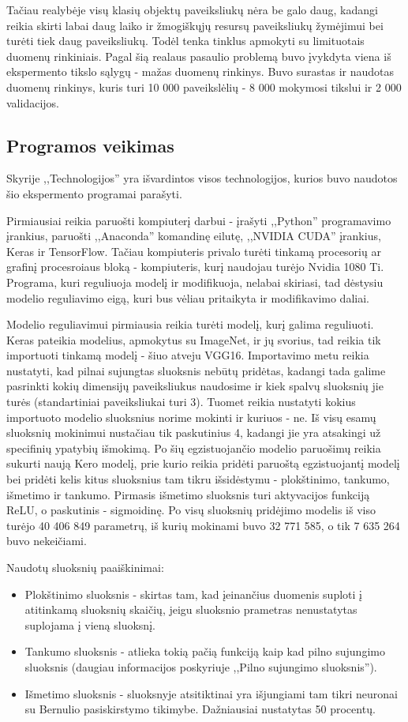 \documentclass{VUMIFPSkursinis}
\begin{document}
Tačiau realybėje visų klasių objektų paveiksliukų nėra be galo daug, kadangi reikia skirti labai daug laiko ir žmogiškųjų resursų paveiksliukų žymėjimui bei turėti tiek 
daug paveiksliukų. Todėl tenka tinklus apmokyti su limituotais duomenų rinkiniais. Pagal šią realaus pasaulio problemą buvo įvykdyta viena iš ekspermento tikslo sąlygų - 
mažas duomenų rinkinys. Buvo surastas ir naudotas duomenų rinkinys, kuris turi 10 000 paveikslėlių - 8 000 mokymosi tikslui ir 2 000 validacijos.

\subsection{Programos veikimas}
Skyrije ,,Technologijos'' yra išvardintos visos technologijos, kurios buvo naudotos šio ekspermento programai parašyti.

Pirmiausiai reikia paruošti kompiuterį darbui - įrašyti ,,Python'' programavimo įrankius, paruošti ,,Anaconda'' komandinę eilutę, ,,NVIDIA CUDA'' įrankius, Keras ir 
TensorFlow. Tačiau kompiuteris privalo turėti tinkamą procesorių ar grafinį procesroiaus bloką - kompiuteris, kurį naudojau turėjo Nvidia 1080 Ti. Programa, kuri 
reguliuoja modelį ir modifikuoja, nelabai skiriasi, tad dėstysiu modelio reguliavimo eigą, kuri bus vėliau pritaikyta ir modifikavimo daliai. 

Modelio reguliavimui pirmiausia reikia turėti modelį, kurį galima reguliuoti. Keras pateikia modelius, apmokytus su ImageNet, ir jų svorius, tad reikia tik importuoti 
tinkamą modelį - šiuo atveju VGG16. Importavimo metu reikia nustatyti, kad pilnai sujungtas sluoksnis nebūtų pridėtas, kadangi tada galime pasrinkti kokių dimensijų 
paveiksliukus naudosime ir kiek spalvų sluoksnių jie turės (standartiniai paveiksliukai turi 3). Tuomet reikia nustatyti kokius importuoto modelio sluoksnius norime 
mokinti ir kuriuos - ne. Iš visų esamų sluoksnių mokinimui nustačiau tik paskutinius 4, kadangi jie yra atsakingi už specifinių ypatybių išmokimą. Po šių egzistuojančio 
modelio paruošimų reikia sukurti naują Kero modelį, prie kurio reikia pridėti paruoštą egzistuojantį modelį bei pridėti kelis kitus sluoksnius tam tikru išsidėstymu - 
plokštinimo, tankumo, išmetimo ir tankumo. Pirmasis išmetimo sluoksnis turi aktyvacijos funkciją ReLU, o paskutinis - sigmoidinę. Po visų sluoksnių pridėjimo modelis iš 
viso turėjo 40 406 849 parametrų, iš kurių mokinami buvo 32 771 585, o tik 7 635 264 buvo nekeičiami. 

Naudotų sluoksnių paaiškinimai:
\begin{itemize}
\item Plokštinimo sluoksnis - skirtas tam, kad įeinančius duomenis suploti į atitinkamą sluoksnių skaičių, jeigu sluoksnio prametras nenustatytas suplojama į vieną sluoksnį.
\item Tankumo sluoksnis - atlieka tokią pačią funkciją kaip kad pilno sujungimo sluoksnis (daugiau informacijos poskyriuje ,,Pilno sujungimo sluoksnis'').
\item Išmetimo sluoksnis - sluoksnyje atsitiktinai yra išjungiami tam tikri neuronai su Bernulio pasiskirstymo tikimybe. Dažniausiai nustatytas 50 procentų.
\end{itemize}
\end{document}
